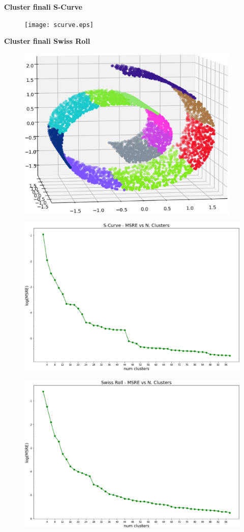\documentclass[a4, landscape]{seminar}
\theoremstyle{definition}
\def\bc{\begin{center}}
\def\ec{\end{center}}
\def\bs{\begin{slide}\begingroup\small}
\def\es{\endgroup\end{slide}}
\begin{document}
\bs
\bc{\bf\color{blue}Cluster finali S-Curve}\ec
\begin{figure}[b]
\centering
\texttt{[image: scurve.eps]}
\end{figure}
\es

\bs
\bc{\bf\color{blue}Cluster finali Swiss Roll}\ec
\begin{figure}[b]
\centering
\includegraphics[width=0.95\textwidth]{swissroll.eps}
\end{figure}
\es

\bs
\begin{figure}[b]
\centering
\includegraphics[width=\textwidth]{scurve_msre.eps}
\end{figure}
\es

\bs
\begin{figure}[b]
\centering
\includegraphics[width=\textwidth]{swiss_msre.eps}
\end{figure}
\es
\end{document}
